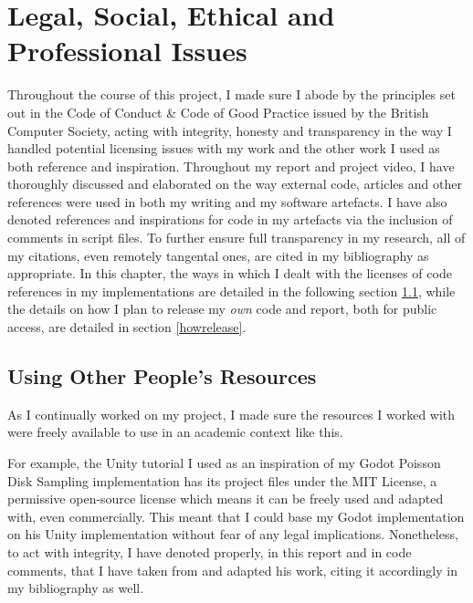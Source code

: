 \chapter{Legal, Social, Ethical and Professional Issues} \label{Issues}

Throughout the course of this project, I made sure I abode by the principles set out in the Code of Conduct \& Code of Good Practice issued by the British Computer Society, acting with integrity, honesty and transparency in the way I handled potential licensing issues with my work and the other work I used as both reference and inspiration. Throughout my report and project video, I have thoroughly discussed and elaborated on the way external code, articles and other references were used in both my writing and my software artefacts. I have also denoted references and inspirations for code in my artefacts via the inclusion of comments in script files. To further ensure full transparency in my research, all of my citations, even remotely tangental ones, are cited in my bibliography as appropriate. In this chapter, the ways in which I dealt with the licenses of code references in my implementations are detailed in the following section \ref{howuse}, while the details on how I plan to release my \textit{own} code and report, both for public access, are detailed in section \ref{howrelease}.  

\section{Using Other People's Resources} \label{howuse}

As I continually worked on my project, I made sure the resources I worked with were freely available to use in an academic context like this.

For example, the Unity tutorial I used as an inspiration of my Godot Poisson Disk Sampling implementation\cite{seblaguetuteYT} has its project files under the MIT License\cite{seblaguetuteGH}, a permissive open-source license which means it can be freely used and adapted with, even commercially.\cite{mitlicense} This meant that I could base my Godot implementation on his Unity implementation without fear of any legal implications. Nonetheless, to act with integrity, I have denoted properly, in this report and in code comments, that I have taken from and adapted his work, citing it accordingly in my bibliography as well.

